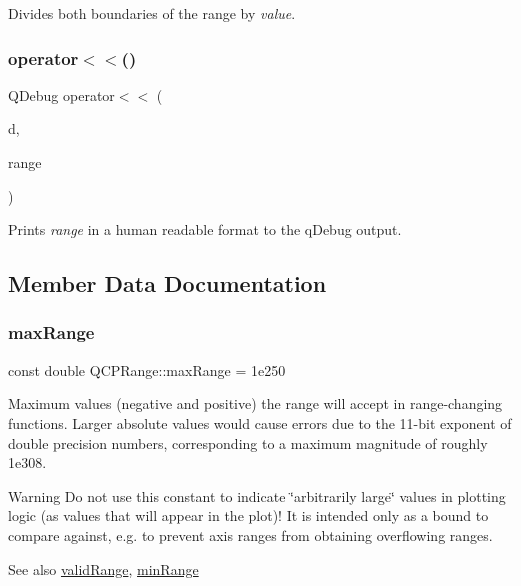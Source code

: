 Divides both boundaries of the range by {\itshape value}. \mbox{\label{classQCPRange_ab4b7d434541ec2e2e00ef3764dde90d8}} 
\subsubsection{\texorpdfstring{operator$<$$<$()}{operator<<()}}
{\footnotesize\ttfamily Q\+Debug operator$<$$<$ (\begin{DoxyParamCaption}\item[{Q\+Debug}]{d,  }\item[{const \hyperlink{classQCPRange}{Q\+C\+P\+Range} \&}]{range }\end{DoxyParamCaption})\hspace{0.3cm}{\ttfamily [related]}}

Prints {\itshape range} in a human readable format to the q\+Debug output. 

\subsection{Member Data Documentation}
\mbox{\label{classQCPRange_a5ca51e7a2dc5dc0d49527ab171fe1f4f}} 
\subsubsection{\texorpdfstring{max\+Range}{maxRange}}
{\footnotesize\ttfamily const double Q\+C\+P\+Range\+::max\+Range = 1e250\hspace{0.3cm}{\ttfamily [static]}}

Maximum values (negative and positive) the range will accept in range-\/changing functions. Larger absolute values would cause errors due to the 11-\/bit exponent of double precision numbers, corresponding to a maximum magnitude of roughly 1e308.

\begin{DoxyWarning}{Warning}
Do not use this constant to indicate \char`\"{}arbitrarily large\char`\"{} values in plotting logic (as values that will appear in the plot)! It is intended only as a bound to compare against, e.\+g. to prevent axis ranges from obtaining overflowing ranges.
\end{DoxyWarning}
\begin{DoxySeeAlso}{See also}
\hyperlink{classQCPRange_ab38bd4841c77c7bb86c9eea0f142dcc0}{valid\+Range}, \hyperlink{classQCPRange_ab46d3bc95030ee25efda41b89e2b616b}{min\+Range} 
\end{DoxySeeAlso}
\mbox{\label{classQCPRange_ab46d3bc95030ee25efda41b89e2b616b}} 

